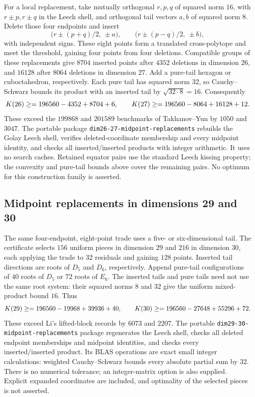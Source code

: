 \documentclass[11pt]{amsart}
\theoremstyle{remark}
\begin{document}
For a local replacement, take mutually orthogonal $r,p,q$ of squared norm
$16$, with $r\pm p,r\pm q$ in the Leech shell, and orthogonal tail vectors
$a,b$ of squared norm $8$. Delete those four endpoints and insert
\[
 \bigl(r\pm(p+q)/2,\ \pm a\bigr),\qquad
 \bigl(r\pm(p-q)/2,\ \pm b\bigr),
\]
with independent signs. These eight points form a translated cross-polytope
and meet the threshold, gaining four points from four deletions. Compatible
groups of these replacements give $8704$ inserted points after $4352$
deletions in dimension $26$, and $16128$ after $8064$ deletions in dimension
$27$. Add a pure-tail hexagon or cuboctahedron, respectively. Each pure tail
has squared norm $32$, so Cauchy--Schwarz bounds its product with an inserted
tail by $\sqrt{32\cdot8}=16$. Consequently
\[
 K(26)\ge\Kcur{26}=196560-4352+8704+6,\qquad
 K(27)\ge\Kcur{27}=196560-8064+16128+12.
\]
These exceed the $199868$ and $201589$ benchmarks of Takhanov--Yun
\cite{takhanov-yun2026} by $1050$ and $3047$. The portable package
\texttt{dim26-27-midpoint-replacements} rebuilds the Golay Leech shell,
verifies deleted-coordinate membership and every midpoint identity, and
checks all inserted/inserted products with integer arithmetic. It uses no
search caches. Retained equator pairs use the standard Leech kissing property;
the convexity and pure-tail bounds above cover the remaining pairs.
No optimum for this construction family is asserted.

\subsection{Midpoint replacements in dimensions 29 and 30}\label{ss:d2930current}

The same four-endpoint, eight-point trade uses a five- or six-dimensional
tail. The certificate selects $156$ uniform pieces in dimension $29$ and
$216$ in dimension $30$, each applying the trade to $32$ residuals and
gaining $128$ points. Inserted tail directions are roots of $D_5$ and $D_6$,
respectively. Append pure-tail configurations of $40$ roots of $D_5$ or
$72$ roots of $E_6$. The inserted tails and pure tails need not use the
same root system: their squared norms $8$ and $32$ give the uniform
mixed-product bound $16$. Thus
\[
 K(29)\ge\Kcur{29}=196560-19968+39936+40,\qquad
 K(30)\ge\Kcur{30}=196560-27648+55296+72.
\]
These exceed Li's lifted-block records \cite{kli28-31-2026} by $6073$
and $2207$. The portable \texttt{dim29-30-midpoint-replacements} package
regenerates the Leech shell, checks all deleted endpoint memberships and
midpoint identities, and checks every inserted/inserted product. Its BLAS
operations are exact small integer calculations: weighted Cauchy--Schwarz
bounds every absolute partial sum by $32$. There is no numerical tolerance;
an integer-matrix option is also supplied. Explicit expanded coordinates
are included, and optimality of the selected pieces is not asserted.
\end{document}
